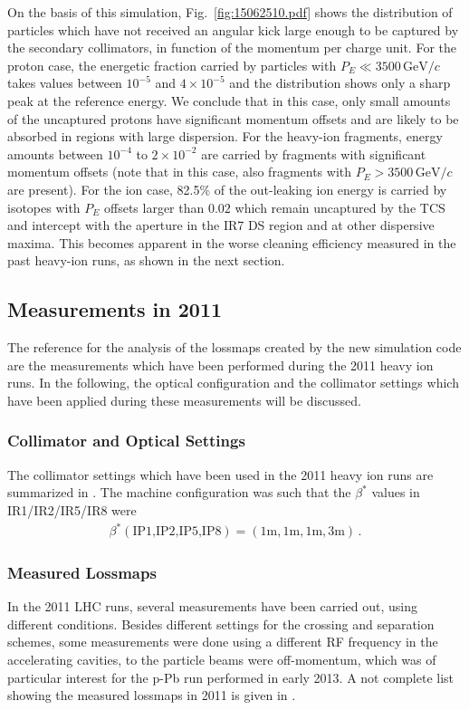 On the basis of this simulation, Fig.~\ref{fig:15062510.pdf} shows the distribution of particles which have not received an angular kick large enough to be captured by the secondary collimators, in function of the momentum per charge unit. For the proton case, the energetic fraction carried by particles with $P_E \ll 3500\,\text{GeV}/c$ takes values between $10^{-5}$ and $4 \times 10^{-5}$ and the distribution shows only a sharp peak at the reference energy. We conclude that in this case, only small amounts of the uncaptured protons have significant momentum offsets and are likely to be absorbed in regions with large dispersion. For the heavy-ion fragments, energy amounts between $10^{-4}$ to $2 \times 10^{-2}$ are carried by fragments with significant momentum offsets (note that in this case, also fragments with $P_E>3500\,\text{GeV}/c$ are present). For the ion case, 82.5\% of the out-leaking ion energy is carried by isotopes with $P_E$ offsets larger than $0.02$ which remain uncaptured by the TCS and intercept with the aperture in the IR7 DS region and at other dispersive maxima. This becomes apparent in the worse cleaning efficiency measured in the past heavy-ion runs, as shown in the next section.






\subsection{Measurements in 2011}
The reference for the analysis of the lossmaps created by the new simulation code are the measurements which have been performed during the 2011 heavy ion runs. In the following, the optical configuration and the collimator settings which have been applied during these measurements will be discussed.
\subsubsection{Collimator and Optical Settings}
The collimator settings which have been used in the 2011 heavy ion runs are summarized in . The machine configuration was such that the $\beta^*$ values in IR1/IR2/IR5/IR8 were
\begin{align}
\beta^*(\text{IP1,IP2,IP5,IP8}) = (1\text{m},1\text{m},1\text{m},3\text{m}) \, .
\end{align}


\subsubsection{Measured Lossmaps}\label{140619}
In the 2011 LHC runs, several measurements have been carried out, using different conditions. Besides different settings for the crossing and separation schemes, some measurements were done using a different RF frequency in the accelerating cavities, to the particle beams were off-momentum, which was of particular interest for the p-Pb run performed in early 2013. A not complete list showing the measured lossmaps in 2011 is given in . 

